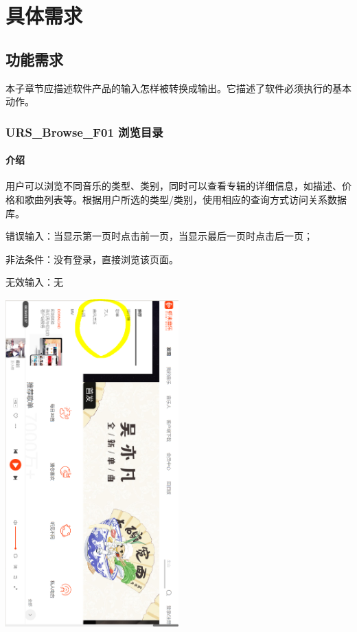 \chapter{具体需求}
\section{功能需求}

本子章节应描述软件产品的输入怎样被转换成输出。它描述了软件必须执行的基本动作。 

\subsection{URS\_Browse\_F01 浏览目录}

\subsubsection{介绍}

用户可以浏览不同音乐的类型、类别，同时可以查看专辑的详细信息，如描述、价格和歌曲列表等。根据用户所选的类型/类别，使用相应的查询方式访问关系数据库。

错误输入：当显示第一页时点击前一页，当显示最后一页时点击后一页；

非法条件：没有登录，直接浏览该页面。

无效输入：无

\begin{center} 
\begin{sideways}
\includegraphics[width=0.5\textwidth]{./figures/capture.png} 
\end{sideways}
\end{center}
